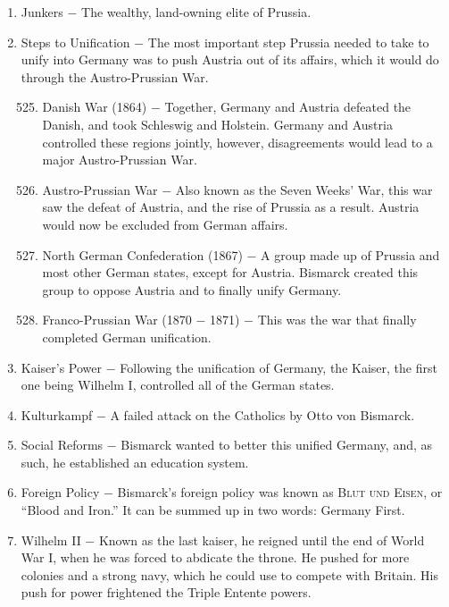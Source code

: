 \documentclass[12pt]{article}
\begin{document}
\begin{enumerate}
\item Junkers $-$ The wealthy, land-owning elite of Prussia.

\item Steps to Unification $-$ The most important step Prussia needed to take to unify into Germany was to push Austria out of its affairs, which it would do through the Austro-Prussian War.

\begin{enumerate}[label=\arabic{*}.]
\setcounter{enumii}{524}

\item Danish War (1864) $-$ Together, Germany and Austria defeated the Danish, and took Schleswig and Holstein. Germany and Austria controlled these regions jointly, however, disagreements would lead to a major Austro-Prussian War.

\item Austro-Prussian War $-$ Also known as the Seven Weeks' War, this war saw the defeat of Austria, and the rise of Prussia as a result. Austria would now be excluded from German affairs.

\item North German Confederation (1867) $-$ A group made up of Prussia and most other German states, except for Austria. Bismarck created this group to oppose Austria and to finally unify Germany.

\item Franco-Prussian War (1870 $-$ 1871) $-$ This was the war that finally completed German unification.

\end{enumerate}
\setcounter{enumi}{528}

\item Kaiser's Power $-$ Following the unification of Germany, the Kaiser, the first one being Wilhelm I, controlled all of the German states.

\item Kulturkampf $-$ A failed attack on the Catholics by Otto von Bismarck.

\item Social Reforms $-$ Bismarck wanted to better this unified Germany, and, as such, he established an education system.

\item Foreign Policy $-$ Bismarck's foreign policy was known as \textsc{Blut und Eisen}, or ``Blood and Iron.'' It can be summed up in two words: Germany First.

\item Wilhelm II $-$ Known as the last kaiser, he reigned until the end of World War I, when he was forced to abdicate the throne. He pushed for more colonies and a strong navy, which he could use to compete with Britain. His push for power frightened the Triple Entente powers.


\end{enumerate}
\end{document}
